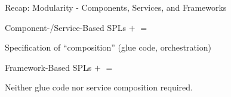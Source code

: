 \begin{frame}{Recap: Modularity - Components, Services, and Frameworks}
	\begin{mycolumns}[widths={40,60},animation=none]
		\begin{example}{Component-/Service-Based SPLs}
				\vspace*{\fill}
					$+$ 
				\vspace*{\fill}	
				\vspace*{\fill}
					$=$ 
				\vspace*{\fill}	
		\end{example}	
		\begin{example}{Specification of ``composition'' (glue code, orchestration)}
			\centering
		\end{example}
	\mynextcolumn		
		\begin{example}{Framework-Based SPLs}
				\vspace*{\fill}
					$+$ 
				\vspace*{\fill}	
				\vspace*{\fill}
					$=$ 
				\vspace*{\fill}	
		\end{example}
		\begin{note}{}
			Neither glue code nor service composition required.
		\end{note}			
	\end{mycolumns}	
\end{frame}

